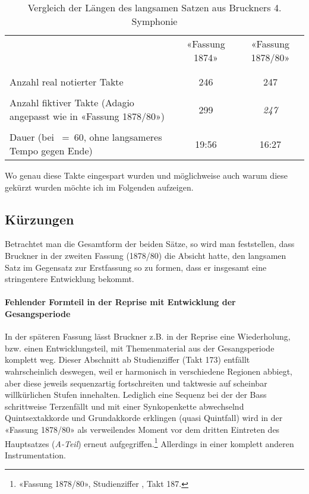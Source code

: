 \begin{table}[htbp]
	\caption{Vergleich der Längen des langsamen Satzen aus Bruckners 4. Symphonie}
	\label{tab:duration}
	\centering
	\begin{tabular}{p{5.5cm}|cc}
		& «Fassung 1874» & «Fassung 1878/80» \\
		&& \\[-0.5em]
		\hline
		&& \\[-0.5em]
		Anzahl real notierter Takte & 246 & 247 \\
		&& \\[-0.5em]
		Anzahl fiktiver Takte \small{(Adagio angepasst wie in «Fassung 1878/80»)} & 299 & \emph{247} \\
		&& \\[-0.5em]
		Dauer \small{(bei \quarternote~=~60, ohne langsameres Tempo gegen Ende)} & 19:56 & 16:27 \\
	\end{tabular}
\end{table}

Wo genau diese Takte eingespart wurden und möglichweise auch warum diese gekürzt wurden möchte ich im Folgenden aufzeigen.


\subsection{Kürzungen}

Betrachtet man die Gesamtform der beiden Sätze, so wird man feststellen, dass Bruckner in der zweiten Fassung (1878/80) die Absicht hatte, den langsamen Satz im Gegensatz zur Erstfassung so zu formen, dass er insgesamt eine stringentere Entwicklung bekommt.

\paragraph{Fehlender Formteil in der Reprise mit Entwicklung der Gesangsperiode}

In der späteren Fassung lässt Bruckner z.B. in der Reprise eine Wiederholung, bzw. einen Entwicklungsteil, mit Themenmaterial aus der Gesangsperiode komplett weg.
Dieser Abschnitt ab Studienziffer  (Takt 173) entfällt wahrscheinlich deswegen, weil er harmonisch in verschiedene Regionen abbiegt, aber diese jeweils sequenzartig fortschreiten und taktwesie auf scheinbar willkürlichen Stufen innehalten.
Lediglich eine Sequenz bei der der Bass schrittweise Terzenfällt und mit einer Synkopenkette abwechselnd Quintsextakkorde und Grundakkorde erklingen (quasi Quintfall) wird in der «Fassung 1878/80» als verweilendes Moment vor dem dritten Eintreten des Hauptsatzes (\emph{A-Teil}) erneut aufgegriffen.\footnote{«Fassung 1878/80», Studienziffer , Takt 187.}
Allerdings in einer komplett anderen Instrumentation.

